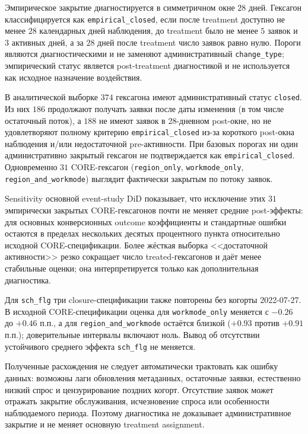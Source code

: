 \documentclass[14pt,a4paper]{extarticle}
\begin{document}
Эмпирическое закрытие диагностируется в симметричном окне \(28\) дней. Гексагон классифицируется как \texttt{empirical\_closed}, если после treatment доступно не менее \(28\) календарных дней наблюдения, до treatment было не менее \(5\) заявок и \(3\) активных дней, а за \(28\) дней после treatment число заявок равно нулю. Пороги являются диагностическими и не заменяют административный \texttt{change\_type}; эмпирический статус является post-treatment диагностикой и не используется как исходное назначение воздействия.

В аналитической выборке \(374\) гексагона имеют административный статус \texttt{closed}. Из них \(186\) продолжают получать заявки после даты изменения (в том числе остаточный поток), а \(188\) не имеют заявок в 28-дневном post-окне, но не удовлетворяют полному критерию \texttt{empirical\_closed} из-за короткого post-окна наблюдения и/или недостаточной pre-активности. При базовых порогах ни один административно закрытый гексагон не подтверждается как \texttt{empirical\_closed}. Одновременно \(31\) CORE-гексагон (\texttt{region\_only}, \texttt{workmode\_only}, \texttt{region\_and\_workmode}) выглядит фактически закрытым по потоку заявок.

Sensitivity основной event-study DiD показывает, что исключение этих \(31\) эмпирически закрытых CORE-гексагонов почти не меняет средние post-эффекты: для основных конверсионных outcome коэффициенты и стандартные ошибки остаются в пределах нескольких десятых процентного пункта относительно исходной CORE-спецификации. Более жёсткая выборка <<достаточной активности>> резко сокращает число treated-гексагонов и даёт менее стабильные оценки; она интерпретируется только как дополнительная диагностика.

Для \texttt{sch\_flg} три closure-спецификации также повторены без когорты
2022-07-27. В исходной CORE-спецификации оценка для
\texttt{workmode\_only} меняется с \(-0.26\) до \(+0.46\) п.п., а для
\texttt{region\_and\_workmode} остаётся близкой (\(+0.93\) против
\(+0.91\) п.п.); доверительные интервалы включают ноль. Вывод об отсутствии
устойчивого среднего эффекта \texttt{sch\_flg} не меняется.

Полученные расхождения не следует автоматически трактовать как ошибку данных: возможны лаги обновления метаданных, остаточные заявки, естественно низкий спрос и цензурирование поздних когорт. Отсутствие заявок может отражать закрытие обслуживания, исчезновение спроса или особенности наблюдаемого периода. Поэтому диагностика не доказывает административное закрытие и не меняет основную treatment assignment.
\end{document}
